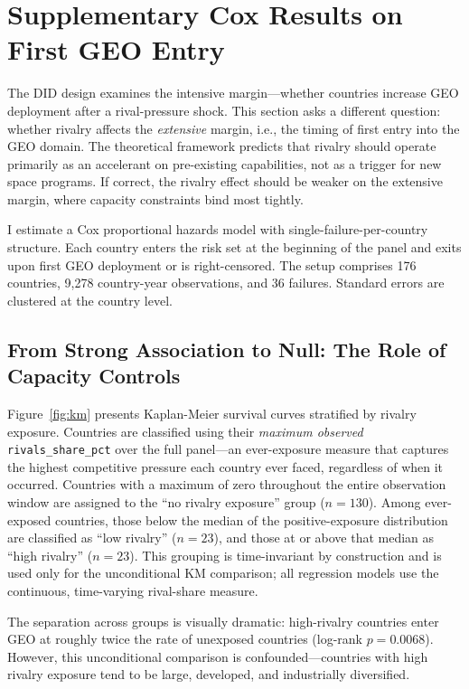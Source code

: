\documentclass[11pt]{article}
\begin{document}
\section{Supplementary Cox Results on First GEO Entry}
\label{sec:cox}

The DID design examines the intensive margin---whether countries increase GEO deployment after a rival-pressure shock. This section asks a different question: whether rivalry affects the \emph{extensive} margin, i.e., the timing of first entry into the GEO domain. The theoretical framework predicts that rivalry should operate primarily as an accelerant on pre-existing capabilities, not as a trigger for new space programs. If correct, the rivalry effect should be weaker on the extensive margin, where capacity constraints bind most tightly.

I estimate a Cox proportional hazards model with single-failure-per-country structure. Each country enters the risk set at the beginning of the panel and exits upon first GEO deployment or is right-censored. The setup comprises 176 countries, 9,278 country-year observations, and 36 failures. Standard errors are clustered at the country level.


\subsection{From Strong Association to Null: The Role of Capacity Controls}

Figure~\ref{fig:km} presents Kaplan-Meier survival curves stratified by rivalry exposure. Countries are classified using their \emph{maximum observed} \texttt{rivals\_share\_pct} over the full panel---an ever-exposure measure that captures the highest competitive pressure each country ever faced, regardless of when it occurred. Countries with a maximum of zero throughout the entire observation window are assigned to the ``no rivalry exposure'' group ($n = 130$). Among ever-exposed countries, those below the median of the positive-exposure distribution are classified as ``low rivalry'' ($n = 23$), and those at or above that median as ``high rivalry'' ($n = 23$). This grouping is time-invariant by construction and is used only for the unconditional KM comparison; all regression models use the continuous, time-varying rival-share measure.

The separation across groups is visually dramatic: high-rivalry countries enter GEO at roughly twice the rate of unexposed countries (log-rank $p = 0.0068$). However, this unconditional comparison is confounded---countries with high rivalry exposure tend to be large, developed, and industrially diversified.
\end{document}
